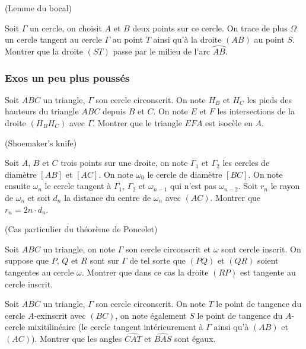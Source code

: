 \begin{exo}(Lemme du bocal)

Soit $\Gamma$ un cercle, on choisit $A$ et $B$ deux points sur ce cercle. On trace de plus $\Omega$ un cercle tangent au cercle $\Gamma$ au point $T$ ainsi qu'à la droite $(AB)$ au point $S$. Montrer que la droite $(ST)$ passe par le milieu de l'arc $\wideparen{AB}$.
\end{exo}

\subsubsection{Exos un peu plus poussés}


\begin{exo}

Soit $ABC$ un triangle, $\Gamma$ son cercle circonscrit. On note $H_B$ et $H_C$ les pieds des hauteurs du triangle $ABC$ depuis $B$ et $C$. On note $E$ et $F$ les intersections de la droite $(H_BH_C)$ avec $\Gamma$. Montrer que le triangle $EFA$ est isocèle en $A$.
\end{exo}


\begin{exo}(Shoemaker's knife)

Soit $A$, $B$ et $C$ trois points sur une droite, on note $\Gamma_1$ et $\Gamma_2$ les cercles de diamètre $[AB]$ et $[AC]$. On note $\omega_0$ le cercle de diamètre $[BC]$. On note ensuite $\omega_n$ le cercle tangent à $\Gamma_1$, $\Gamma_2$ et $\omega_{n-1}$ qui n'est pas $\omega_{n-2}$. Soit $r_n$ le rayon de $\omega_n$ et soit $d_n$ la distance du centre de $\omega_n$ avec $(AC)$. Montrer que $r_n=2n \cdot d_n$.
\end{exo}


\begin{exo}(Cas particulier du théorème de Poncelet)

Soit $ABC$ un triangle, on note $\Gamma$ son cercle circonscrit et $\omega$ sont cercle inscrit. On suppose que $P$, $Q$ et $R$ sont sur $\Gamma$ de tel sorte que $(PQ)$ et $(QR)$ soient tangentes au cercle $\omega$. Montrer que dans ce cas la droite $(RP)$ est tangente au cercle inscrit.
\end{exo}

\begin{exo}

Soit $ABC$ un triangle, $\Gamma$ son cercle circonscrit. On note $T$ le point de tangence du cercle $A$-exinscrit avec $(BC)$, on note également $S$ le point de tangence du $A$-cercle mixitilinéaire (le cercle tangent intérieurement à $\Gamma$ ainsi qu'à $(AB)$ et $(AC)$). Montrer que les angles $\widehat{CAT}$ et $\widehat{BAS}$ sont égaux.
\end{exo}


